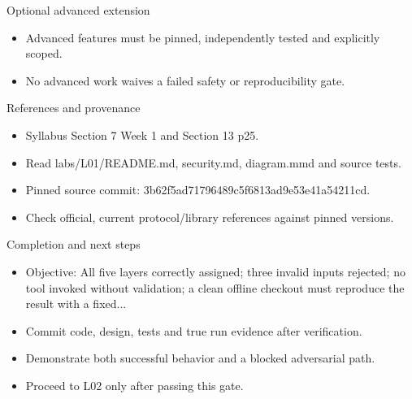 \documentclass[aspectratio=169,10pt]{beamer}
\begin{document}
\begin{frame}{Optional advanced extension}
\small
\begin{itemize}
\item Advanced features must be pinned, independently tested and explicitly scoped.
\item No advanced work waives a failed safety or reproducibility gate.
\end{itemize}

\end{frame}

\begin{frame}{References and provenance}
\small
\begin{itemize}
\item Syllabus Section 7 Week 1 and Section 13 p25.
\item Read labs/L01/README.md, security.md, diagram.mmd and source tests.
\item Pinned source commit: 3b62f5ad71796489c5f6813ad9e53e41a54211cd.
\item Check official, current protocol/library references against pinned versions.
\end{itemize}

\end{frame}

\begin{frame}{Completion and next steps}
\small
\begin{itemize}
\item Objective: All five layers correctly assigned; three invalid inputs rejected; no tool invoked without validation; a clean offline checkout must reproduce the result with a fixed...
\item Commit code, design, tests and true run evidence after verification.
\item Demonstrate both successful behavior and a blocked adversarial path.
\item Proceed to L02 only after passing this gate.
\end{itemize}

\end{frame}
\end{document}
